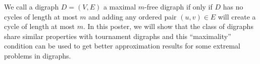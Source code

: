 \endtitle

We call a digraph $D = (V,E)$ a maximal $m$-free digraph if only if $D$ has no cycles of length at most $m$ and adding any ordered pair $(u, v)\in E$ will create a cycle of
length at most $m$. In this poster, we will show that the class of digraphs share similar properties with tournament digraphs and this ``maximality'' condition can be used to get better approximation results for some extremal problems in digraphs.

